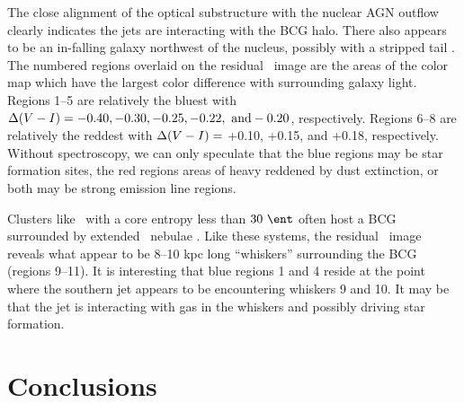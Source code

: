 \documentclass[11pt, preprint]{aastex}
\begin{document}
The close alignment of the optical substructure with the nuclear AGN
outflow clearly indicates the jets are interacting with the BCG
halo. There also appears to be an in-falling galaxy northwest of the
nucleus, possibly with a stripped tail \citep[see][for
  example]{2007ApJ...671..190S}. The numbered regions overlaid on the
residual \myv\ image are the areas of the color map which have the
largest color difference with surrounding galaxy light. Regions 1--5
are relatively the bluest with $\Delta(V-I) = -0.40, -0.30,
-0.25, -0.22, ~\rm{and} -0.20$, respectively. Regions 6--8 are
relatively the reddest with $\Delta(V-I) =$ +0.10, +0.15, and
+0.18, respectively. Without spectroscopy, we can only speculate that
the blue regions may be star formation sites, the red regions areas of
heavy reddened by dust extinction, or both may be strong emission line
regions.

Clusters like \rbs\ with a core entropy less than $30 ~\ent$ often
host a BCG surrounded by extended \halpha\ nebulae
\citep[\eg][]{mcdonald10}. Like these systems, the residual
\myi\ image reveals what appear to be 8--10 kpc long ``whiskers''
surrounding the BCG (regions 9--11). It is interesting that blue
regions 1 and 4 reside at the point where the southern jet appears to
be encountering whiskers 9 and 10. It may be that the jet is
interacting with gas in the whiskers and possibly driving star
formation.

\section{Conclusions}
\label{sec:con}
\end{document}
